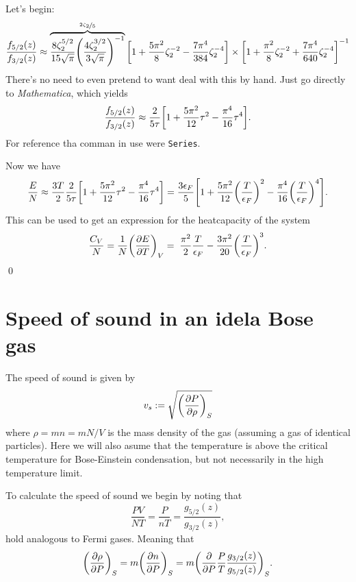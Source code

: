 \documentclass[11pt,letter, swedish, english
]{article}
\renewcommand{\thesubsection}{\arabic{section} (\alph{subsection})}
\begin{document}
Let's begin:
\begin{equation}
\frac{f_{5/2}(z)}{f_{3/2}(z)}\approx
\overbrace{\frac{8\zeta_2^{5/2}}{15\sqrt{\pi}}
\qty(\frac{4\zeta_2^{3/2}}{3\sqrt{\pi}})^{-1}}^{\nicefrac{2\zeta_2}{5}}
\qty[1+\frac{5\pi^2}{8}\zeta_2^{-2}
-\frac{7\pi^4}{384}\zeta_2^{-4} ]
\times \qty[1+\frac{\pi^2}{8}\zeta_2^{-2} 
+\frac{7\pi^4}{640}\zeta_2^{-4} ]^{-1}
\end{equation}
There's no need to even pretend to want deal with this by hand.
Just go directly to \emph{Mathematica}, which yields
\begin{equation}
\frac{f_{5/2}(z)}{f_{3/2}(z)}\approx \frac{2}{5\tau}
\qty[1+\frac{5\pi^2}{12}\tau^2-\frac{\pi^4}{16}\tau^4].
\end{equation}
For reference tha comman in use were \texttt{Series}.

Now we have
\begin{equation}
\frac{E}{N}\approx\frac{3T}{2}\frac{2}{5\tau}
\qty[1+\frac{5\pi^2}{12}\tau^2-\frac{\pi^4}{16}\tau^4]
=\frac{3\epsilon_F}{5}\qty[1
+\frac{5\pi^2}{12}\qty(\frac{T}{\epsilon_F})^2
-\frac{\pi^4}{16}\qty(\frac{T}{\epsilon_F})^4].
\end{equation}
This can be used to get an expression for the heatcapacity of the
system
\begin{equation}\label{eq:CV_Fermi}
\frac{C_V}{N}=\frac{1}{N}\qty(\pdv{E}{T})_V
=\;\frac{\pi^2}{2}\frac{T}{\epsilon_F}
 - \frac{3\pi^2}{20}\qty(\frac{T}{\epsilon_F})^3.
\end{equation}
\qed


\renewcommand{\thesubsection}{\arabic{section} (\alph{subsection})}
\section{Speed of sound in an idela Bose gas}
The speed of sound is given by
\begin{equation}
v_s:=\sqrt{\qty(\pdv{P}{\rho})_S}
\end{equation}
where $\rho=mn=mN/V$ is the mass density of the gas (assuming a gas of
identical particles). Here we will also asume that the temperature is
above the critical temperature for Bose-Einstein condensation, but not
necessarily in the high temperature limit.

To calculate the speed of sound we begin by noting that 
\begin{equation}\label{eq:3_PVNT}
\frac{PV}{NT}=\frac{P}{nT}=\frac{g_{5/2}(z)}{g_{3/2}(z)},
\end{equation}
hold analogous to Fermi gases. Meaning that
\begin{equation}\label{eq:3_dn/dP}
\qty(\pdv{\rho}{P})_S=m\qty(\pdv{n}{P})_S
=m\qty(\pdv{P} \frac{P}{T}\frac{g_{3/2}(z)}{g_{5/2}(z)})_S.
\end{equation}
\end{document}
